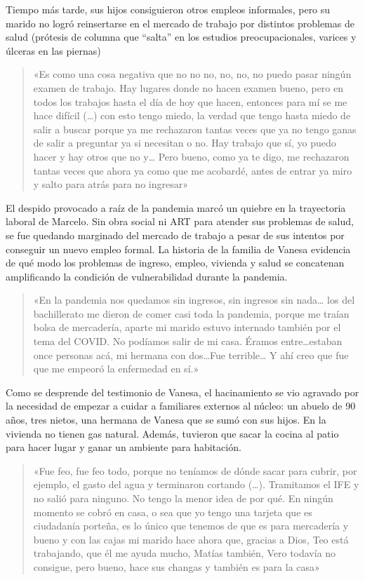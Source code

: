 Tiempo más tarde, sus hijos consiguieron otros empleos informales, pero su marido no logró reinsertarse en el mercado de trabajo por distintos problemas de salud (prótesis de columna que ``salta'' en los estudios preocupacionales, varices y úlceras en las piernas)

\begin{quote}
«Es como una cosa negativa que no no no, no, no, no puedo pasar ningún examen de trabajo. Hay lugares donde no hacen examen bueno, pero en todos los trabajos hasta el día de hoy que hacen, entonces para mí se me hace difícil (\ldots) con esto tengo miedo, la verdad que tengo hasta miedo de salir a buscar porque ya me rechazaron tantas veces que ya no tengo ganas de salir a preguntar ya si necesitan o no. Hay trabajo que sí, yo puedo hacer y hay otros que no y\ldots{} Pero bueno, como ya te digo, me rechazaron tantas veces que ahora ya como que me acobardé, antes de entrar ya miro y salto para atrás para no ingresar»
\end{quote}

El despido provocado a raíz de la pandemia marcó un quiebre en la trayectoria laboral de Marcelo. Sin obra social ni ART para atender sus problemas de salud, se fue quedando marginado del mercado de trabajo a pesar de sus intentos por conseguir un nuevo empleo formal. La historia de la familia de Vanesa evidencia de qué modo los problemas de ingreso, empleo, vivienda y salud se concatenan amplificando la condición de vulnerabilidad durante la pandemia.

\begin{quote}
«En la pandemia nos quedamos sin ingresos, sin ingresos sin nada\ldots{} los del bachillerato me dieron de comer casi toda la pandemia, porque me traían bolsa de mercadería, aparte mi marido estuvo internado también por el tema del COVID. No podíamos salir de mi casa. Éramos entre\ldots estaban once personas acá, mi hermana con dos\ldots Fue terrible\ldots{} Y ahí creo que fue que me empeoró la enfermedad en sí.»
\end{quote}

Como se desprende del testimonio de Vanesa, el hacinamiento se vio agravado por la necesidad de empezar a cuidar a familiares externos al núcleo: un abuelo de 90 años, tres nietos, una hermana de Vanesa que se sumó con sus hijos. En la vivienda no tienen gas natural. Además, tuvieron que sacar la cocina al patio para hacer lugar y ganar un ambiente para habitación.

\begin{quote}
«Fue feo, fue feo todo, porque no teníamos de dónde sacar para cubrir, por ejemplo, el gasto del agua y terminaron cortando (\ldots). Tramitamos el IFE y no salió para ninguno. No tengo la menor idea de por qué. En ningún momento se cobró en casa, o sea que yo tengo una tarjeta que es ciudadanía porteña, es lo único que tenemos de que es para mercadería y bueno y con las cajas mi marido hace ahora que, gracias a Dios, Teo está trabajando, que él me ayuda mucho, Matías también, Vero todavía no consigue, pero bueno, hace sus changas y también es para la casa»
\end{quote}


